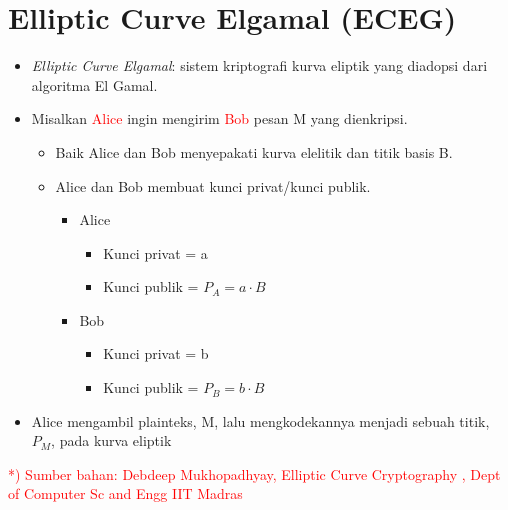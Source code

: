\documentclass{article}
\begin{document}

\section*{Elliptic Curve Elgamal (ECEG)}

\begin{itemize}
    \item \textit{Elliptic Curve Elgamal}: sistem kriptografi kurva eliptik yang diadopsi dari algoritma El Gamal.
    \item Misalkan \textcolor{red}{Alice} ingin mengirim \textcolor{red}{Bob} pesan M yang dienkripsi.
    \begin{itemize}
        \item Baik Alice dan Bob menyepakati kurva elelitik dan titik basis B.
        \item Alice dan Bob membuat kunci privat/kunci publik.
        \begin{itemize}
            \item Alice
            \begin{itemize}
                \item Kunci privat = a
                \item Kunci publik = $P_A = a \cdot B$
            \end{itemize}
            \item Bob
            \begin{itemize}
                \item Kunci privat = b
                \item Kunci publik = $P_B = b \cdot B$
            \end{itemize}
        \end{itemize}
    \end{itemize}
    \item Alice mengambil plainteks, M, lalu mengkodekannya menjadi sebuah titik, $P_M$, pada kurva eliptik
\end{itemize}

\vspace{5mm}

\textcolor{red}{*) Sumber bahan: Debdeep Mukhopadhyay, Elliptic Curve Cryptography , Dept of Computer Sc and Engg IIT Madras}
\end{document}
